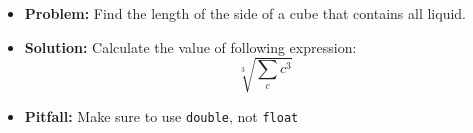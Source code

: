 \begin{frame}
    \frametitle{\problemtitle}
    \begin{itemize}
        \item<+-> \textbf{Problem:} Find the length of the side of a cube that contains all liquid.
        \item<+-> \textbf{Solution:} Calculate the value of following expression:
            \[ \sqrt[3]{\sum_{c} c^3} \]
        \item<+-> \textbf{Pitfall:} Make sure to use \texttt{double}, not \texttt{float}
    \end{itemize}
    \solvestats
\end{frame}
